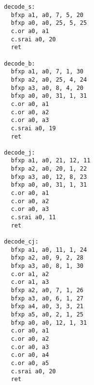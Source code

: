 \begin{multicols}{2}
\begin{verbatim}
  decode_s:
    bfxp a1, a0, 7, 5, 20
    bfxp a0, a0, 25, 5, 25
    c.or a0, a1
    c.srai a0, 20
    ret

  decode_b:
    bfxp a1, a0, 7, 1, 30
    bfxp a2, a0, 25, 4, 24
    bfxp a3, a0, 8, 4, 20
    bfxp a0, a0, 31, 1, 31
    c.or a0, a1
    c.or a0, a2
    c.or a0, a3
    c.srai a0, 19
    ret

  decode_j:
    bfxp a1, a0, 21, 12, 11
    bfxp a2, a0, 20, 1, 22
    bfxp a3, a0, 12, 8, 23
    bfxp a0, a0, 31, 1, 31
    c.or a0, a1
    c.or a0, a2
    c.or a0, a3
    c.srai a0, 11
    ret

  decode_cj:
    bfxp a1, a0, 11, 1, 24
    bfxp a2, a0, 9, 2, 28
    bfxp a3, a0, 8, 1, 30
    c.or a1, a2
    c.or a1, a3
    bfxp a2, a0, 7, 1, 26
    bfxp a3, a0, 6, 1, 27
    bfxp a4, a0, 3, 3, 21
    bfxp a5, a0, 2, 1, 25
    bfxp a0, a0, 12, 1, 31
    c.or a0, a1
    c.or a0, a2
    c.or a0, a3
    c.or a0, a4
    c.or a0, a5
    c.srai a0, 20
    ret
\end{verbatim}
\end{multicols}
